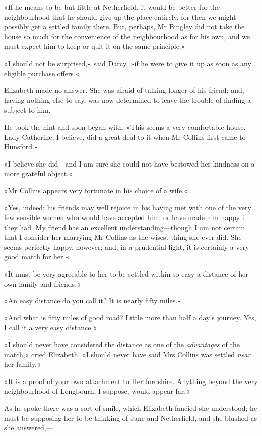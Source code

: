»If he means to be but little at Netherfield, it would be better for the neighbourhood that he should give up the place entirely, for then we might possibly get a settled family there. But, perhaps, Mr Bingley did not take the house so much for the convenience of the neighbourhood as for his own, and we must expect him to keep or quit it on the same principle.«

»I should not be surprised,« said Darcy, »if he were to give it up as soon as any eligible purchase offers.«

Elizabeth made no answer. She was afraid of talking longer of his friend; and, having nothing else to say, was now determined to leave the trouble of finding a subject to him.

He took the hint and soon began with, »This seems a very comfortable house. Lady Catherine, I believe, did a great deal to it when Mr Collins first came to Hunsford.«

»I believe she did—and I am sure she could not have bestowed her kindness on a more grateful object.«

»Mr Collins appears very fortunate in his choice of a wife.«

»Yes, indeed; his friends may well rejoice in his having met with one of the very few sensible women who would have accepted him, or have made him happy if they had. My friend has an excellent understanding—though I am not certain that I consider her marrying Mr Collins as the wisest thing she ever did. She seems perfectly happy, however; and, in a prudential light, it is certainly a very good match for her.«

»It must be very agreeable to her to be settled within so easy a distance of her own family and friends.«

»An easy distance do you call it? It is nearly fifty miles.«

»And what is fifty miles of good road? Little more than half a day's journey. Yes, I call it a very easy distance.«

»I should never have considered the distance as one of the \textit{advantages} of the match,« cried Elizabeth. »I should never have said Mrs Collins was settled \textit{near} her family.«

»It is a proof of your own attachment to Hertfordshire. Anything beyond the very neighbourhood of Longbourn, I suppose, would appear far.«

As he spoke there was a sort of smile, which Elizabeth fancied she understood; he must be supposing her to be thinking of Jane and Netherfield, and she blushed as she answered,—

